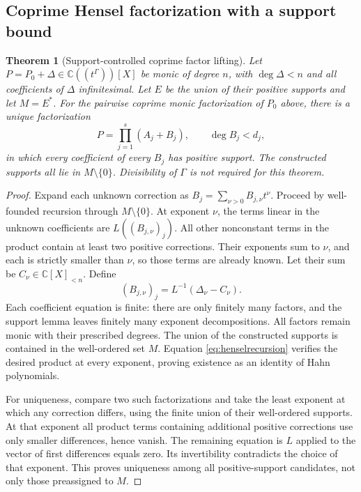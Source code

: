 \documentclass[11pt,letterpaper]{article}
\numberwithin{equation}{section}
\newtheorem{theorem}{Theorem}[section]
\theoremstyle{definition}
\theoremstyle{remark}
\newcommand{\C}{\mathbb C}
\begin{document}
\subsection{Coprime Hensel factorization with a support bound}
\begin{theorem}[Support-controlled coprime factor lifting]\label{thm:hensel}
Let $P=P_0+\Delta\in\C((t^\Gamma))[X]$ be monic of degree $n$, with
$\deg\Delta<n$ and all coefficients of $\Delta$ infinitesimal. Let $E$
be the union of their positive supports and let $M=E^*$. For the pairwise
coprime monic factorization of $P_0$ above, there is a unique factorization
\begin{equation}\label{eq:henselfactors}
 P=\prod_{j=1}^s(A_j+B_j),\qquad
 \deg B_j<d_j,
\end{equation}
in which every coefficient of every $B_j$ has positive support. The
constructed supports all lie in $M\setminus\{0\}$.
Divisibility of $\Gamma$ is not required for this theorem.
\end{theorem}
\begin{proof}
Expand each unknown correction as $B_j=\sum_{\nu>0}B_{j,\nu}t^\nu$.
Proceed by well-founded recursion through $M\setminus\{0\}$.
At exponent $\nu$, the terms linear in the unknown coefficients are
$L((B_{j,\nu})_j)$. All other nonconstant terms in the product contain
at least two positive corrections. Their exponents sum to $\nu$, and
each is strictly smaller than $\nu$, so those terms are already known.
Let their sum be $C_\nu\in\C[X]_{<n}$. Define
\begin{equation}\label{eq:henselrecursion}
 (B_{j,\nu})_j=L^{-1}(\Delta_\nu-C_\nu).
\end{equation}
Each coefficient equation is finite: there are only finitely many factors,
and the support lemma leaves finitely many exponent decompositions.
All factors remain monic with their prescribed degrees. The union of the
constructed supports is contained in the well-ordered set $M$.
Equation \eqref{eq:henselrecursion} verifies the desired product at every
exponent, proving existence as an identity of Hahn polynomials.

For uniqueness, compare two such factorizations and take the least
exponent at which any correction differs, using the finite union of their
well-ordered supports. At that exponent all product terms containing
additional positive corrections use only smaller differences, hence
vanish. The remaining equation is $L$ applied to the vector of first
differences equals zero. Its invertibility contradicts the choice of that
exponent. This proves uniqueness among all positive-support candidates,
not only those preassigned to $M$.
\end{proof}
\end{document}
